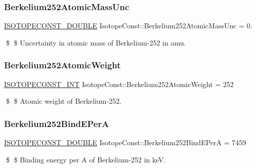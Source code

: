 \subsubsection{\texorpdfstring{Berkelium252\+Atomic\+Mass\+Unc}{Berkelium252AtomicMassUnc}}
{\footnotesize\ttfamily \mbox{\hyperlink{group___isotope_const-_macros_ga8f45a7272ce02c0b4c65c44636ed719a}{I\+S\+O\+T\+O\+P\+E\+C\+O\+N\+S\+T\+\_\+\+D\+O\+U\+B\+LE}} Isotope\+Const\+::\+Berkelium252\+Atomic\+Mass\+Unc = 0.}

\$ \$ Uncertainty in atomic mass of Berkelium-\/252 in amu. \mbox{\label{group___isotope_const-_berkelium-_bk252_gaae861633389c010905a5c511d33f1108}} 
\subsubsection{\texorpdfstring{Berkelium252\+Atomic\+Weight}{Berkelium252AtomicWeight}}
{\footnotesize\ttfamily \mbox{\hyperlink{group___isotope_const-_macros_ga5f18360b3e99483a35c32d789e62621c}{I\+S\+O\+T\+O\+P\+E\+C\+O\+N\+S\+T\+\_\+\+I\+NT}} Isotope\+Const\+::\+Berkelium252\+Atomic\+Weight = 252}

\$ \$ Atomic weight of Berkelium-\/252. \mbox{\label{group___isotope_const-_berkelium-_bk252_gaf18742e01f7175350145c3cfe7f318cb}} 
\subsubsection{\texorpdfstring{Berkelium252\+Bind\+E\+PerA}{Berkelium252BindEPerA}}
{\footnotesize\ttfamily \mbox{\hyperlink{group___isotope_const-_macros_ga8f45a7272ce02c0b4c65c44636ed719a}{I\+S\+O\+T\+O\+P\+E\+C\+O\+N\+S\+T\+\_\+\+D\+O\+U\+B\+LE}} Isotope\+Const\+::\+Berkelium252\+Bind\+E\+PerA = 7459}

\$ \$ Binding energy per A of Berkelium-\/252 in keV. \mbox{\label{group___isotope_const-_berkelium-_bk252_gaa4fb73274fc28f8727fcd7279e735779}} 
